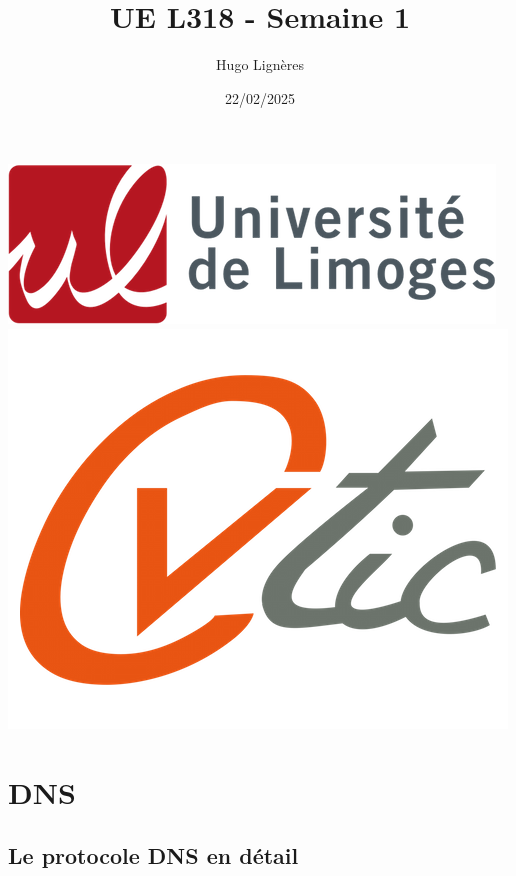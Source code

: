 \documentclass[12pt,a4paper]{article}
\title{UE L318 - Semaine 1}
\author{Hugo Lignères}
\date{22/02/2025}
\begin{document}
\maketitle

\hrulefill
\vspace{6cm}
\begin{center}
	\includegraphics[scale=.4]{../images/univ.png}
		\\
		\vspace{2cm}
	\includegraphics[scale=.25]{../images/cvtic.png}
\end{center}


\newpage

\tableofcontents

\newpage

\section{DNS}

	\subsection{Le protocole DNS en détail}
	
\end{document}
